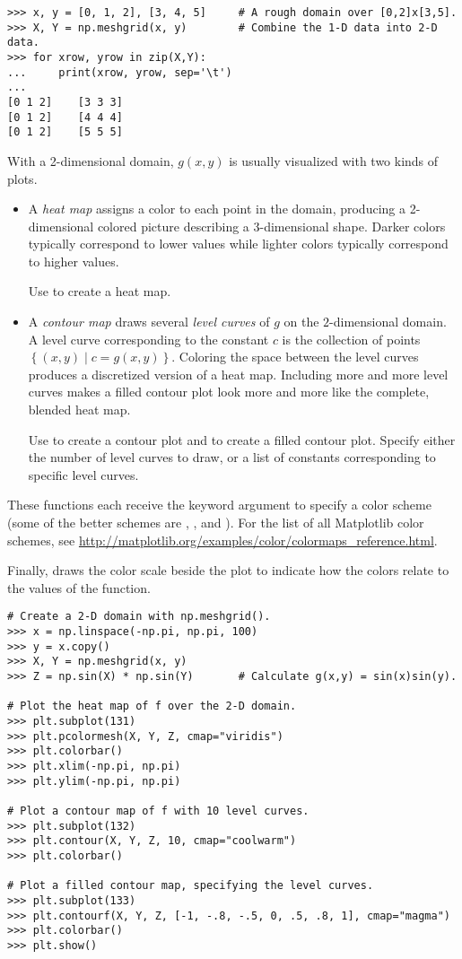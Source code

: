 \begin{lstlisting}
>>> x, y = [0, 1, 2], [3, 4, 5]     # A rough domain over [0,2]x[3,5].
>>> X, Y = np.meshgrid(x, y)        # Combine the 1-D data into 2-D data.
>>> for xrow, yrow in zip(X,Y):
...     print(xrow, yrow, sep='\t')
...
[0 1 2]    [3 3 3]
[0 1 2]    [4 4 4]
[0 1 2]    [5 5 5]
\end{lstlisting}

With a 2-dimensional domain, $g(x,y)$ is usually visualized with two kinds of plots.

\begin{itemize}
\item A \emph{heat map} assigns a color to each point in the domain, producing a 2-dimensional colored picture describing a 3-dimensional shape.
Darker colors typically correspond to lower values while lighter colors typically correspond to higher values.

Use  to create a heat map.

\item A \emph{contour map} draws several \emph{level curves} of $g$ on the $2$-dimensional domain.
A level curve corresponding to the constant $c$ is the collection of points $\left\{(x,y)\mid c = g(x,y)\right\}$.
Coloring the space between the level curves produces a discretized version of a heat map.
Including more and more level curves makes a filled contour plot look more and more like the complete, blended heat map.

Use  to create a contour plot and  to create a filled contour plot.
Specify either the number of level curves to draw, or a list of constants corresponding to specific level curves.
\end{itemize}

These functions each receive the keyword argument  to specify a color scheme (some of the better schemes are , , and ).
For the list of all Matplotlib color schemes, see \url{http://matplotlib.org/examples/color/colormaps_reference.html}.

Finally,  draws the color scale beside the plot to indicate how the colors relate to the values of the function.

\begin{lstlisting}
# Create a 2-D domain with np.meshgrid().
>>> x = np.linspace(-np.pi, np.pi, 100)
>>> y = x.copy()
>>> X, Y = np.meshgrid(x, y)
>>> Z = np.sin(X) * np.sin(Y)       # Calculate g(x,y) = sin(x)sin(y).

# Plot the heat map of f over the 2-D domain.
>>> plt.subplot(131)
>>> plt.pcolormesh(X, Y, Z, cmap="viridis")
>>> plt.colorbar()
>>> plt.xlim(-np.pi, np.pi)
>>> plt.ylim(-np.pi, np.pi)

# Plot a contour map of f with 10 level curves.
>>> plt.subplot(132)
>>> plt.contour(X, Y, Z, 10, cmap="coolwarm")
>>> plt.colorbar()

# Plot a filled contour map, specifying the level curves.
>>> plt.subplot(133)
>>> plt.contourf(X, Y, Z, [-1, -.8, -.5, 0, .5, .8, 1], cmap="magma")
>>> plt.colorbar()
>>> plt.show()
\end{lstlisting}

